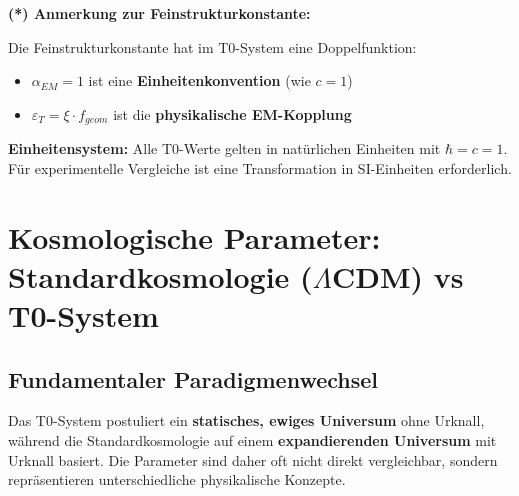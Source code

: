 \documentclass[12pt,a4paper]{article}
\begin{document}
\textbf{(*) Anmerkung zur Feinstrukturkonstante:}

Die Feinstrukturkonstante hat im T0-System eine Doppelfunktion:
\begin{itemize}
	\item $\alpha_{EM} = 1$ ist eine \textbf{Einheitenkonvention} (wie $c = 1$)
	\item $\varepsilon_T = \xi \cdot f_{geom}$ ist die \textbf{physikalische EM-Kopplung}
\end{itemize}

\textbf{Einheitensystem:}
Alle T0-Werte gelten in natürlichen Einheiten mit $\hbar = c = 1$. Für experimentelle Vergleiche ist eine Transformation in SI-Einheiten erforderlich.

\section{Kosmologische Parameter: Standardkosmologie ($\Lambda$CDM) vs T0-System}
\label{sec:cosmic_t0_mapping}

\subsection{Fundamentaler Paradigmenwechsel}
\label{subsec:paradigm_shift}

\begin{tcolorbox}[colback=red!5!white,colframe=red!75!black,title=Warnung: Fundamentale Unterschiede]
	Das T0-System postuliert ein \textbf{statisches, ewiges Universum} ohne Urknall, während die Standardkosmologie auf einem \textbf{expandierenden Universum} mit Urknall basiert. Die Parameter sind daher oft nicht direkt vergleichbar, sondern repräsentieren unterschiedliche physikalische Konzepte.
\end{tcolorbox}
\end{document}
